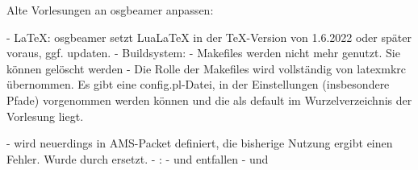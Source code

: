 Alte Vorlesungen an osgbeamer anpassen:

- LaTeX: osgbeamer setzt LuaLaTeX in der TeX-Version von 1.6.2022 oder später voraus, ggf. updaten.
- Buildsystem:
  - Makefiles werden nicht mehr genutzt. Sie können gelöscht werden
  - Die Rolle der Makefiles wird vollständig von latexmkrc übernommen. Es gibt eine config.pl-Datei, in der Einstellungen (insbesondere Pfade) vorgenommen werden können und die als default im Wurzelverzeichnis der Vorlesung liegt.

- \grave wird neuerdings in AMS-Packet definiert, die bisherige Nutzung ergibt einen Fehler. Wurde durch \stress ersetzt.
- \lectdates:
  - \setaspectration und \enforceaspectration entfallen
  - \SetGlobalClassOptions und \EnforceGlobalClassOptions

